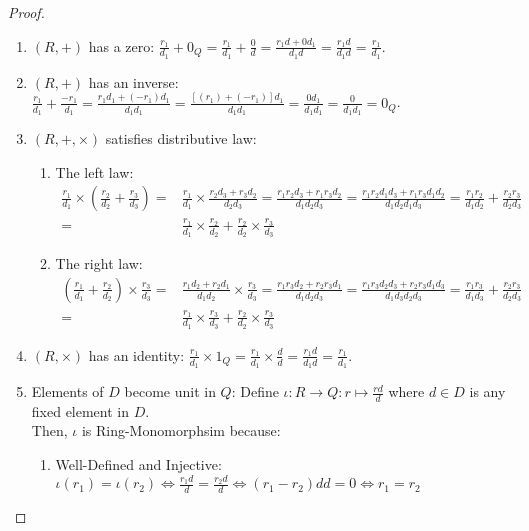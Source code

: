 \documentclass[8pt]{report}
\theoremstyle{romanstyle}
\newcommand{\dis}{\displaystyle}
\begin{document}
\begin{proof}
\begin{enumerate}
        \item $(R, +)$ has a zero: $\dis \frac{r_1}{d_1} + 0_Q = \frac{r_1}{d_1} + \frac{0}{d} = \frac{r_1 d + 0 d_1}{d_1 d} = \frac{r_1 d}{d_1 d} = \frac{r_1}{d_1}$.
        \item $(R, +)$ has an inverse: $\dis \frac{r_1}{d_1} + \frac{-r_1}{d_1} = \frac{r_1d_1 + (-r_1)d_1}{d_1 d_1} = \frac{[(r_1) + (-r_1)]d_1}{d_1 d_1} = \frac{0 d_1}{d_1 d_1} = \frac{0}{d_1 d_1} = 0_Q$.
        \item $(R, +, \times)$ satisfies distributive law:
        \begin{enumerate}[label=\theenumi-\arabic*.]
            \item The left law:
            \begin{align*}
                \frac{r_1}{d_1} \times \left( \frac{r_2}{d_2} + \frac{r_3}{d_3} \right)
            = &\frac{r_1}{d_1} \times \frac{r_2 d_3 + r_3 d_2}{d_2 d_3}
            = \frac{r_1 r_2 d_3 + r_1 r_3 d_2}{d_1 d_2 d_3}
            = \frac{r_1 r_2 d_1 d_3 + r_1 r_3 d_1 d_2}{d_1 d_2 d_1 d_3}
            = \frac{r_1 r_2}{d_1 d_2} + \frac{r_2 r_3}{d_2 d_3} \\
            = &\frac{r_1}{d_1} \times \frac{r_2}{d_2} + \frac{r_2}{d_2} \times \frac{r_3}{d_3}
            \end{align*}
            \item The right law:
            \begin{align*}
                \left(\frac{r_1}{d_1} + \frac{r_2}{d_2}\right) \times \frac{r_3}{d_3}
            = &\frac{r_1 d_2 + r_2 d_1}{d_1 d_2} \times \frac{r_3}{d_3}
            = \frac{r_1 r_3 d_2 + r_2 r_3 d_1}{d_1 d_2 d_3}
            = \frac{r_1 r_3 d_2 d_3 + r_2 r_3 d_1 d_3}{d_1 d_3 d_2 d_3}
            = \frac{r_1 r_3}{d_1 d_3} + \frac{r_2 r_3}{d_2 d_3} \\
            = &\frac{r_1}{d_1} \times \frac{r_3}{d_3} + \frac{r_2}{d_2} \times \frac{r_3}{d_3}
            \end{align*}
        \end{enumerate}
        \item $(R, \times)$ has an identity: $\dis \frac{r_1}{d_1} \times 1_Q = \frac{r_1}{d_1} \times \frac{d}{d} = \frac{r_1d}{d_1d} = \frac{r_1}{d_1}$.
        \item Elements of $D$ become unit in $Q$: Define $\iota:R \to Q:r \mapsto \dis \frac{rd}{d}$ where $d \in D$ is any fixed element in $D$. \\
        Then, $\iota$ is Ring-Monomorphsim because:
        \begin{enumerate}[label=\theenumi-\arabic*.]
            \item Well-Defined and Injective: 
            $\dis \iota (r_1) = \iota (r_2)
            \iff \frac{r_1 d}{d} = \frac{r_2 d}{d} 
            \iff (r_1 - r_2) d d= 0
            \iff r_1 = r_2$
        \end{enumerate}
    \end{enumerate}    
\end{proof}
\end{document}
